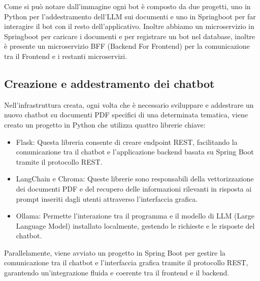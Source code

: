 \documentclass[a4paper,twoside,12pt]{toptesi}
\begin{document}
Come si può notare dall'immagine ogni bot è composto da due progetti, uno in Python per l'addestramento dell'LLM sui documenti e uno in Springboot per far interagire il bot con il resto dell'applicativo. Inoltre abbiamo un microservizio in Springboot per caricare i documenti e per registrare un bot nel database, inoltre è presente un microservizio BFF (Backend For Frontend) per la comunicazione tra il Frontend e i restanti microservizi.


\subsection{Creazione e addestramento dei chatbot}

Nell'infrastruttura creata, ogni volta che è necessario sviluppare e addestrare un nuovo chatbot su documenti PDF specifici di una determinata tematica, viene creato un progetto in Python che utilizza quattro librerie chiave:

\begin{itemize}
	\item Flask: Questa libreria consente di creare endpoint REST, facilitando la comunicazione tra il chatbot e l'applicazione backend basata su Spring Boot tramite il protocollo REST.
	\item LangChain e Chroma: Queste librerie sono responsabili della vettorizzazione dei documenti PDF e del recupero delle informazioni rilevanti in risposta ai prompt inseriti dagli utenti attraverso l'interfaccia grafica.
	\item Ollama: Permette l'interazione tra il programma e il modello di LLM (Large Language Model) installato localmente, gestendo le richieste e le risposte del chatbot.
\end{itemize}

Parallelamente, viene avviato un progetto in Spring Boot per gestire la comunicazione tra il chatbot e l'interfaccia grafica tramite il protocollo REST, garantendo un'integrazione fluida e coerente tra il frontend e il backend.
\end{document}

